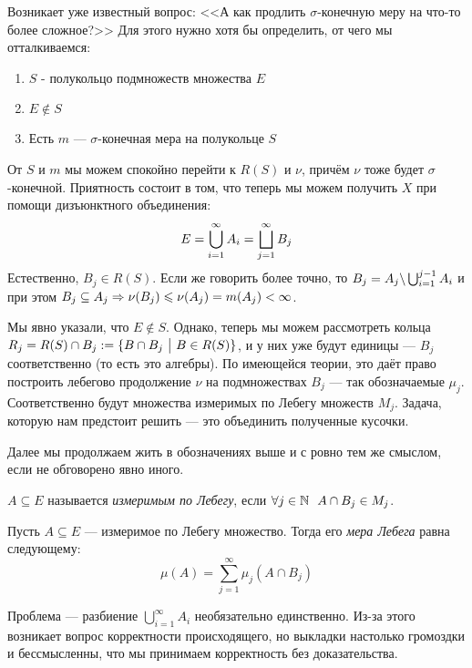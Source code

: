 \begin{note}
	Возникает уже известный вопрос: <<А как продлить $\sigma$-конечную меру на что-то более сложное?>> Для этого нужно хотя бы определить, от чего мы отталкиваемся:
	\begin{enumerate}
		\item $S$ - полукольцо подмножеств множества $E$
		
		\item $E \notin S$
		
		\item Есть $m$ --- $\sigma$-конечная мера на полукольце $S$
	\end{enumerate}
	От $S$ и $m$ мы можем спокойно перейти к $R(S)$ и $\nu$, причём $\nu$ тоже будет $\sigma$-конечной. Приятность состоит в том, что теперь мы можем получить $X$ при помощи дизъюнктного объединения:
	\[
		E = \bigcup_{i = 1}^\infty A_i = \bigsqcup_{j = 1}^\infty B_j
	\]
	Естественно, $B_j \in R(S)$. Если же говорить более точно, то $B_j = A_j \backslash \bigcup_{i = 1}^{j - 1} A_i$ и при этом $B_j \subseteq A_j \Rightarrow \nu(B_j) \leqslant \nu(A_j) = m(A_j) < \infty$.
	
	Мы явно указали, что $E \notin S$. Однако, теперь мы можем рассмотреть кольца $R_j = R(S) \cap B_j := \{B \cap B_j \ \big|\  B \in R(S)\}$, и у них уже будут единицы --- $B_j$ соответственно (то есть это алгебры). По имеющейся теории, это даёт право построить лебегово продолжение $\nu$ на подмножествах $B_j$ --- так обозначаемые $\mu_j$. Соответственно будут множества измеримых по Лебегу множеств $M_j$. Задача, которую нам предстоит решить --- это объединить полученные кусочки.
\end{note}

\begin{note}
	Далее мы продолжаем жить в обозначениях выше и с ровно тем же смыслом, если не обговорено явно иного.
\end{note}

\begin{definition}
	$A \subseteq E$ называется \textit{измеримым по Лебегу}, если $\forall j \in \mathbb{N}\ \ A \cap B_j \in M_j$.
\end{definition}

\begin{definition}
	Пусть $A \subseteq E$ --- измеримое по Лебегу множество. Тогда его \textit{мера Лебега} равна следующему:
	\[
		\mu(A) = \sum_{j = 1}^\infty \mu_j(A \cap B_j)
	\]
\end{definition}

\begin{note}
	Проблема --- разбиение $\bigcup_{i = 1}^\infty A_i$ необязательно единственно. Из-за этого возникает вопрос корректности происходящего, но выкладки настолько громоздки и бессмысленны, что мы принимаем корректность без доказательства.
\end{note}

